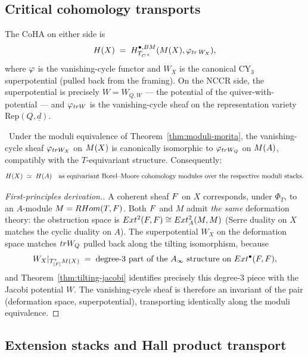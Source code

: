 \subsection*{Critical cohomology transports}

The CoHA on either side is
\[
  H(X) \;=\; H^{\bullet,BM}_{T_{C^\times}}(M(X), \varphi_{tr\,W_X}),
\]
where $\varphi$ is the vanishing-cycle functor and $W_X$ is the canonical CY$_3$
superpotential (pulled back from the framing). On the NCCR side, the
superpotential is precisely $W = W_{Q,W}$ --- the potential of the
quiver-with-potential --- and $\varphi_{tr W}$ is the vanishing-cycle sheaf on
the representation variety $\mathrm{Rep}(Q, \underline{d})$.

\begin{theorem}
\label{thm:vanishing-cycle-transport}
\ClaimStatusTheorem\ Under the moduli equivalence of
Theorem~\ref{thm:moduli-morita}, the vanishing-cycle sheaf
$\varphi_{tr W_X}$ on $M(X)$ is canonically isomorphic to
$\varphi_{tr W_Q}$ on $M(A)$, compatibly with the $T$-equivariant structure.
Consequently:
\[
  H(X) \;\simeq\; H(A) \quad\text{as equivariant Borel--Moore
  cohomology modules over the respective moduli stacks.}
\]
\end{theorem}

\begin{proof}[First-principles derivation.]
A coherent sheaf $F$ on $X$ corresponds, under $\Phi_T$, to an $A$-module
$M = RHom(T, F)$. Both $F$ and $M$ admit \emph{the same} deformation
theory: the obstruction space is $Ext^{2}(F, F) \cong Ext^{2}_A(M, M)$
(Serre duality on $X$ matches the cyclic duality on $A$). The superpotential
$W_X$ on the deformation space matches $tr W_Q$ pulled back along the tilting
isomorphism, because
\[
  W_X|_{T^{*}_{[F]} M(X)} \;=\;
  \text{degree-3 part of the $A_\infty$ structure on $Ext^\bullet(F, F)$},
\]
and Theorem~\ref{thm:tilting-jacobi} identifies precisely this degree-3 piece
with the Jacobi potential $W$. The vanishing-cycle sheaf is therefore an
invariant of the pair (deformation space, superpotential), transporting
identically along the moduli equivalence.
\end{proof}

\subsection*{Extension stacks and Hall product transport}

